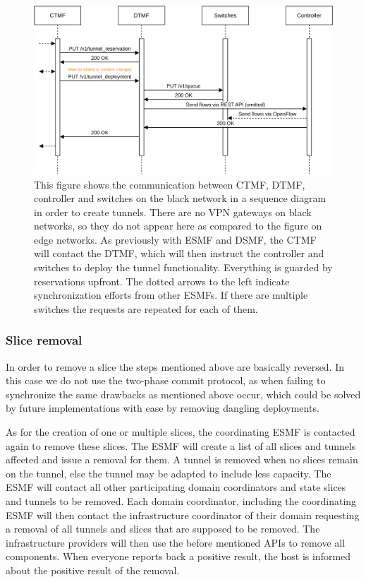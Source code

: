 \begin{figure}[H]
  \centering
  \includegraphics[width=\linewidth]{images/chapter_6/slice_creation_bn.png}
  \caption[Slice creation on a black network]{This figure shows the communication between CTMF, DTMF, controller and switches on the black network in a sequence diagram in order to create tunnels. There are no VPN gateways on black networks, so they do not appear here as compared to the figure on edge networks. As previously with ESMF and DSMF, the CTMF will contact the DTMF, which will then instruct the controller and switches to deploy the tunnel functionality. Everything is guarded by reservations upfront. The dotted arrows to the left indicate synchronization efforts from other ESMFs. If there are multiple switches the requests are repeated for each of them.}
  \label{fig:slice_creation_bn}
\end{figure}

\newpage

\subsubsection{Slice removal}
In order to remove a slice the steps mentioned above are basically reversed. In this case we do not use the two-phase commit protocol, as when failing to synchronize the same drawbacks as mentioned above occur, which could be solved by future implementations with ease by removing dangling deployments.

As for the creation of one or multiple slices, the coordinating ESMF is contacted again to remove these slices. The ESMF will create a list of all slices and tunnels affected and issue a removal for them. A tunnel is removed when no slices remain on the tunnel, else the tunnel may be adapted to include less capacity. The ESMF will contact all other participating domain coordinators and state slices and tunnels to be removed. Each domain coordinator, including the coordinating ESMF will then contact the infrastructure coordinator of their domain requesting a removal of all tunnels and slices that are supposed to be removed. The infrastructure providers will then use the before mentioned APIs to remove all components. When everyone reports back a positive result, the host is informed about the positive result of the removal.

